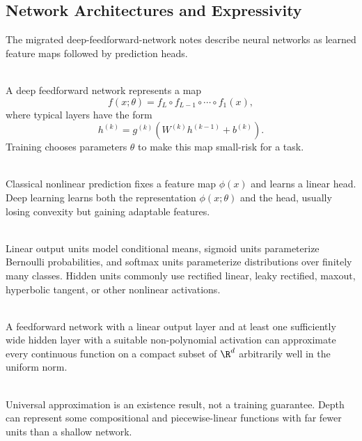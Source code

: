 \subsection{Network Architectures and Expressivity}

The migrated deep-feedforward-network notes describe neural networks as learned feature maps followed by prediction heads.

\begin{definition} \label{def:sl-feedforward-network} \\
A deep feedforward network represents a map
\[
f(x;\theta)=f_L\circ f_{L-1}\circ\cdots\circ f_1(x),
\]
where typical layers have the form
\[
h^{(k)}=g^{(k)}(W^{(k)}h^{(k-1)}+b^{(k)}).
\]
Training chooses parameters $\theta$ to make this map small-risk for a task.
\end{definition}

\begin{remark} \label{rem:sl-learned-feature-map} \\
Classical nonlinear prediction fixes a feature map $\phi(x)$ and learns a linear head.  Deep learning learns both the representation $\phi(x;\theta)$ and the head, usually losing convexity but gaining adaptable features.
\end{remark}

\begin{definition} \label{def:sl-output-and-hidden-units} \\
Linear output units model conditional means, sigmoid units parameterize Bernoulli probabilities, and softmax units parameterize distributions over finitely many classes.  Hidden units commonly use rectified linear, leaky rectified, maxout, hyperbolic tangent, or other nonlinear activations.
\end{definition}

\begin{theorem} \label{thm:sl-universal-approximation-form} \\
A feedforward network with a linear output layer and at least one sufficiently wide hidden layer with a suitable non-polynomial activation can approximate every continuous function on a compact subset of $\R^d$ arbitrarily well in the uniform norm.
\end{theorem}

\begin{remark} \label{rem:sl-depth-expressivity} \\
Universal approximation is an existence result, not a training guarantee.  Depth can represent some compositional and piecewise-linear functions with far fewer units than a shallow network.
\end{remark}
